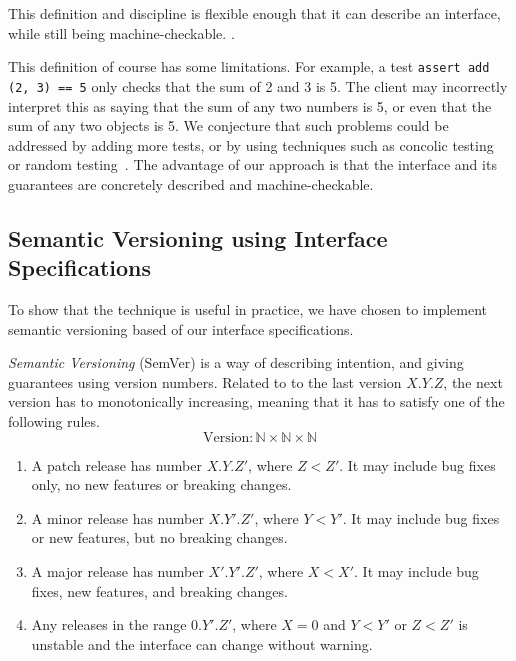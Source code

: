 This definition and discipline is flexible enough that it can describe
an interface, while still being machine-checkable. .

 This definition of course has some limitations. For
example, a test \texttt{assert add (2, 3) == 5} only checks that the
sum of 2 and 3 is 5. The client may incorrectly interpret this as
saying that the sum of any two numbers is 5, or even that the sum of
any two objects is 5. We conjecture that such problems could be
addressed by adding more tests, or by using techniques such as
concolic testing~\cite{sen05-cute} or random
testing~\cite{quickcheck}. The advantage of our approach is that the
interface and its guarantees are concretely described and
machine-checkable.

\subsection{Semantic Versioning using Interface Specifications}

To show that the technique is useful in practice, we have chosen to implement
semantic versioning based of our interface specifications.

\begin{definition}\textit{Semantic Versioning} (SemVer) is a way of describing
intention, and giving guarantees using version numbers\cite{semver}.
Related to to the last version $X.Y.Z$, the next version has to
monotonically increasing, meaning that it has to satisfy one of the
following rules.
$$ \text{Version} : \mathbb{N} \times \mathbb{N} \times \mathbb{N} $$

\begin{enumerate}
    \item A patch release has number $X.Y.Z'$, where $Z < Z'$. It may include
    bug fixes only, no new features or breaking changes.
    
    \item A minor release has number $X.Y'.Z'$, where $Y < Y'$. It may include
    bug fixes or new features, but no breaking changes.
    
    \item A major release has number $X'.Y'.Z'$, where $X < X'$. It may include
    bug fixes, new features, and breaking changes.
    
    \item Any releases in the range $0.Y'.Z'$, where $X = 0$ and $Y < Y'$ or $Z
    < Z'$ is unstable and the interface can change without warning.
\end{enumerate}

\end{definition}

